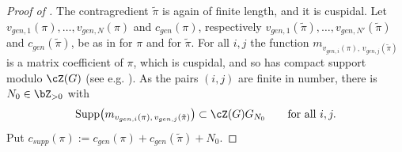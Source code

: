 \documentclass[12pt,a4paper]{amsart}%
\newcommand{\DimaA}[1]{{{#1}}}
\begin{document}
\begin{proof}[Proof of ]
The contragredient $\tilde\pi$ is again of finite length, and it is cuspidal.
Let $v_{gen,1}(\pi),\dots,v_{gen,N}(\pi)$ and $c_{gen}(\pi)$, respectively
$v_{gen,1}(\tilde\pi),\dots,v_{gen,N'}(\tilde\pi)$ and $c_{gen}(\tilde\pi)$, be as in
 for $\pi$ and for $\tilde\pi$. For all $i,j$ the function
$m_{v_{gen,i}(\pi),\,v_{gen,j}(\tilde\pi)}$ is a matrix coefficient of $\pi$, which is cuspidal,
and so has compact support modulo $\cZ(G)$ (\DimaA{see e.g.} \cite[VI.2.1]{Ren}). As the pairs $(i,j)$ are finite
in number, there is $N_0\in\Z_{>0}$ with
\begin{equation}\label{eq:supp.gen}
\Supp\bigl(m_{v_{gen,i}(\pi),\,v_{gen,j}(\tilde\pi)}\bigr)\subset\cZ(G)G_{N_0}
\qquad\text{for all }i,j .
\end{equation}
Put $c_{supp}(\pi):=c_{gen}(\pi)+c_{gen}(\tilde\pi)+N_0$.


\end{proof}
\end{document}
